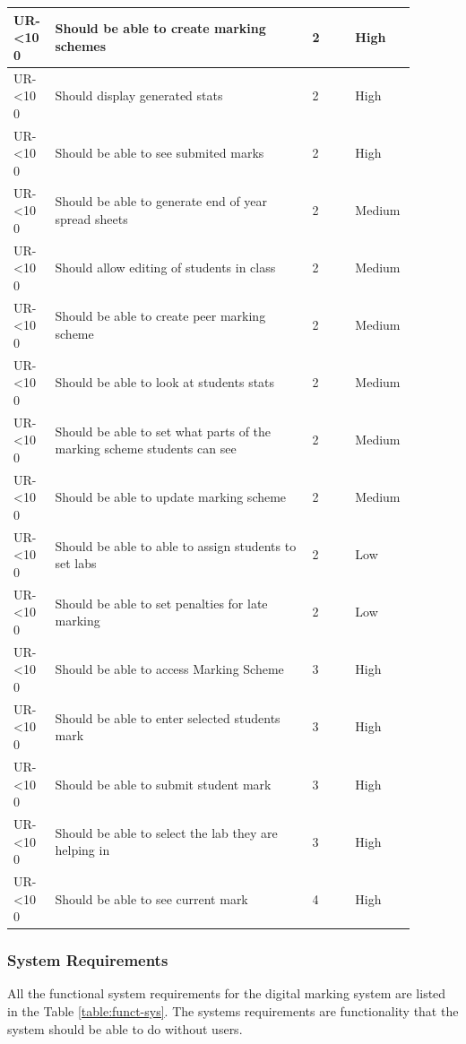 \documentclass[12pt]{article}  %
\newcommand{\rid}[1]{\centering #1-\ifnum\value{requirement}<10 0\fi\arabic{requirement} \stepcounter{requirement}}
\begin{document}
\begin{spacing}{1.2}
\begin{longtable}{|p{0.09\linewidth}|p{0.6\linewidth}|p{0.1\linewidth}|
p{0.1\linewidth}|}
\rid{UR} & Should be able to create marking schemes & 2 & High\\ \hline
\rid{UR} & Should display generated stats & 2 & High\\ \hline
\rid{UR} & Should be able to see submited marks & 2 & High\\ \hline
\rid{UR} & Should be able to generate end of year spread sheets & 2 & Medium\\ \hline
\rid{UR} & Should allow editing of students in class & 2 & Medium\\ \hline
\rid{UR} & Should be able to create peer marking scheme & 2 & Medium\\ \hline
\rid{UR} & Should be able to look at students stats & 2 & Medium\\ \hline
\rid{UR} & Should be able to set what parts of the marking scheme students can see & 2 & Medium\\ \hline
\rid{UR} & Should be able to update marking scheme & 2 & Medium \\ \hline
\rid{UR} & Should be able to able to assign students to set labs & 2 & Low \\ \hline
\rid{UR} & Should be able to set penalties for late marking & 2 & Low \\ \hline

\rid{UR} & Should be able to access Marking Scheme & 3 & High\\ \hline
\rid{UR} & Should be able to enter selected students mark & 3 & High\\ \hline
\rid{UR} & Should be able to submit student mark & 3 & High\\ \hline
\rid{UR} & Should be able to select the lab they are helping in & 3 & High\\ \hline


\rid{UR} & Should be able to see current mark & 4 & High\\ \hline

\end{longtable}
\end{spacing}
\setcounter{requirement}{1}

\newpage
\subsubsection{System Requirements}


All the functional system requirements for the digital marking system are listed in the Table \ref{table:funct-sys}. The systems requirements are functionality that the system should be able to do without users.
\end{document}
